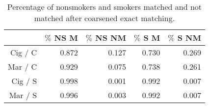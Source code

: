 \begin{table}[ht]
\centering
\begin{tabular}{rrrrr}
  \hline 
 & \small $\%$ NS M & \small $\%$ NS NM & \small $\%$ S M & \small $\%$ S NM \\ 
  \hline
Cig / C & 0.872 & 0.127 & 0.730 & 0.269 \\ 
  Mar / C & 0.929 & 0.075 & 0.738 & 0.261 \\ 
  Cig / S & 0.998 & 0.001 & 0.992 & 0.007 \\ 
  Mar / S & 0.996 & 0.003 & 0.992 & 0.007 \\ 
   \hline
\end{tabular}
\caption{Percentage of nonsmokers and smokers matched and not matched after coarsened exact matching.}
\end{table}
